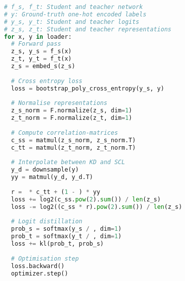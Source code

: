 

\renewcommand\thelstlisting{1}
\begin{figure}[t]
\centering
\begin{minipage}[t]{0.9\linewidth}
\begin{lstlisting}[basicstyle=\scriptsize\ttfamily, mathescape, language=Python, caption={PyTorch-style pseudocode for MobileVOS}, captionpos=t,
numberbychapter=false,label={alg:training_pseudo_code}]
# f_s, f_t: Student and teacher network
# y: Ground-truth one-hot encoded labels
# y_s, y_t: Student and teacher logits
# z_s, z_t: Student and teacher representations
for x, y in loader:
  # Forward pass
  z_s, y_s = f_s(x)
  z_t, y_t = f_t(x)
  z_s = embed_s(z_s)
  
  # Cross entropy loss
  loss = bootstrap_poly_cross_entropy(y_s, y)
  
  # Normalise representations
  z_s_norm = F.normalize(z_s, dim=1)
  z_t_norm = F.normalize(z_t, dim=1)
  
  # Compute correlation-matrices
  c_ss = matmul(z_s_norm, z_s_norm.T)
  c_tt = matmul(z_t_norm, z_t_norm.T)
  
  # Interpolate between KD and SCL
  y_d = downsample(y)
  yy = matmul(y_d, y_d.T)
  
  r =  * c_tt + (1 - ) * yy
  loss += log2(c_ss.pow(2).sum()) / len(z_s) 
  loss -= log2((c_ss * r).pow(2).sum()) / len(z_s)
  
  # Logit distillation
  prob_s = softmax(y_s / , dim=1)
  prob_t = softmax(y_t / , dim=1)
  loss += kl(prob_t, prob_s)
  
  # Optimisation step
  loss.backward()
  optimizer.step()
\end{lstlisting}
\end{minipage}
\end{figure}
%
